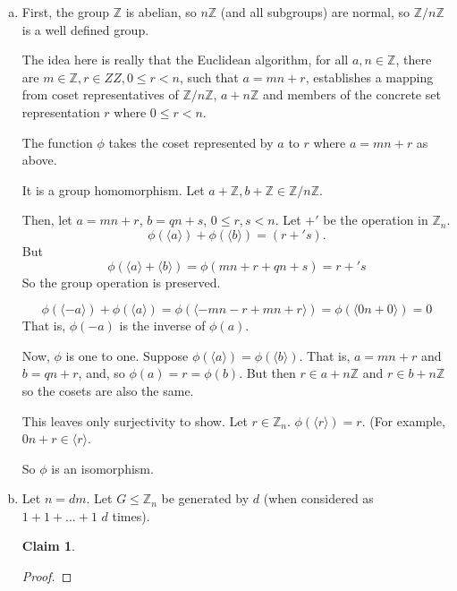 \documentclass[11pt,oneside]{article}
\numberwithin{equation}{section}
\theoremstyle{definition}
\newtheorem{exercise}{Exercise}
\newtheorem*{claim}{Claim}
\def\ZZ{\mathbb{Z}}
\begin{document}
\begin{solution}
  \begin{enumerate}[(a)]
  \item
    First, the group $\ZZ$ is abelian, so $n\ZZ$ (and all subgroups)
    are normal, so $\ZZ / n\ZZ$ is a well defined group.  
    
    The idea here is really that the Euclidean algorithm, for all $a,
    n \in \ZZ$, there are $m \in \ZZ, r \in ZZ, 0 \leq r < n$, such
    that $ a = m n + r$, establishes a mapping from coset representatives of $ \ZZ / n\ZZ$,
    $a + n\ZZ$ and members of the concrete set representation $ r$ where $ 0 \leq r < n$.  
    
    The function $\phi$ takes the coset represented by $a$ to $r$ where $a = mn +r$ as above. 

    It is a group homomorphism.  Let $a + \ZZ, b + \ZZ \in \ZZ / n\ZZ$.

\def\pmod{+'}
    Then, let $ a = mn + r$, $b = qn + s$, $ 0 \leq r, s < n$.  Let $\pmod$ be the operation in $\ZZ_n$. 
    $$
    \phi (\langle a \rangle) + \phi(\langle b \rangle) = (r \pmod s). 
    $$
    But
    $$ \phi(\langle a \rangle + \langle b \rangle ) = \phi (mn + r + qn + s) = r \pmod s
    $$
    So the group operation is preserved. 

    $$ \phi (\langle -a \rangle) + \phi (\langle a \rangle ) = \phi (\langle -mn - r + mn + r \rangle) = \phi(\langle 0n + 0 \rangle ) = 0
    $$
    That is, $\phi(-a)$ is the inverse of $\phi(a)$.

    Now, $\phi$ is one to one. Suppose $\phi(\langle a \rangle ) =
    \phi(\langle b \rangle )$.  That is, $a = mn +r$ and $b = qn + r$,
    and, so $\phi(a) = r = \phi(b)$. But then $r \in a + n\ZZ $ and $
    r \in b + n \ZZ$ so the cosets are also the same.

    This leaves only surjectivity to show.  Let $r \in \ZZ_n$.  $\phi(\langle r \rangle) = r$.  (For example,
    $0 n + r \in \langle r \rangle$.

    So $\phi$ is an isomorphism.  
    
  \item
    Let $n = d m$.  Let $G \leq \ZZ_n$ be generated by $d$ (when considered as
    $1 + 1 + ... + 1$ $d$ times).
    \begin{claim}
      
    \end{claim}
    \begin{proof}
    \end{proof}

  \end{enumerate}
\end{solution}

\begin{comment}
  \begin{exercise}
    problem
  \end{exercise}
  \begin{solution}
    \begin{enumerate}[(a)]
    \item
      first answer
    \end{enumerate}
  \end{solution}
\end{comment}
\end{document}
